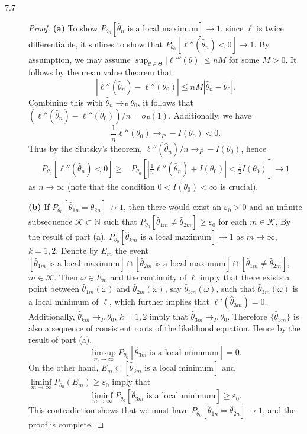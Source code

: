 \documentclass{article}
\newcommand{\eps}{\varepsilon}
\newcommand{\nn}{\mathbb{N}}
\theoremstyle{definition}
\theoremstyle{plain}
\theoremstyle{remark}
\begin{document}
\begin{description}
\item[7.7]
\begin{proof}
\textbf{(a)}
To show $P_{\theta_0}[\hat{\theta}_n \text{ is a local maximum}] \to 1$, since $\ell$ is 
twice differentiable, it suffices to show that $P_{\theta_0}[\ell''(\hat{\theta}_n) < 0] 
\to 1$. By assumption, we may assume $\sup_{\theta \in \Theta}|\ell'''(\theta)| \leq nM$ for 
some $M > 0$. It follows by the mean value theorem that
$$|\ell''(\hat{\theta}_n) - \ell''(\theta_0)| \leq nM|\hat{\theta}_n - \theta_0|.$$
Combining this with $\hat{\theta}_n \to_P \theta_0$, it follows that 
$(\ell''(\hat{\theta}_n) - \ell''(\theta_0))/n = o_P(1)$. Additionally, we have
$$\frac{1}{n}\ell''(\theta_0) \to_P -I(\theta_0) < 0.$$
Thus by the Slutsky's theorem, $\ell''(\hat{\theta}_n)/n \to_P -I(\theta_0)$, hence
\begin{align*}
     P_{\theta_0}[\ell''(\hat{\theta}_n) < 0] 
\geq & P_{\theta_0} \left[\left|\frac{1}{n}\ell''(\hat{\theta}_n) + I(\theta_0) 
\right| < \frac{1}{2}I(\theta_0)\right] 
\to  1
\end{align*}
as $n \to \infty$ (note that the condition $0 < I(\theta_0) < \infty$ is crucial). 

\textbf{(b)}
If $P_{\theta_0}[\hat{\theta}_{1n} = \hat{\theta}_{2n}] \not\to 1$, then there would 
exist an $\eps_0 > 0$ and an infinite subsequence $\mathscr{K} \subset \nn$ such that
$P_{\theta_0}[\hat{\theta}_{1m} \neq \hat{\theta}_{2m}] \geq \eps_0$ for each $m \in 
\mathscr{K}$. By the result of part (a), $P_{\theta_0}[\hat{\theta}_{km} \text{ is
a local maximum}] \to 1$ as $m \to \infty$, $k = 1, 2$. Denote by $E_m$ the event
$[\hat{\theta}_{1m} \text{ is a local maximum}] \cap [\hat{\theta}_{2m} \text{ is 
a local maximum}] \cap [\hat{\theta}_{1m} \neq \hat{\theta}_{2m}]$, $m \in 
\mathscr{K}$. Then $\omega \in E_m$ and the continuity of $\ell$ imply that there 
exists a point between $\hat{\theta}_{1m}(\omega)$ and $\hat{\theta}_{2m}(\omega)$, say
$\hat{\theta}_{3m}(\omega)$, such that $\hat{\theta}_{3m}(\omega)$ is a local minimum
of $\ell$, which further implies that $\ell'(\hat{\theta}_{3m}) = 0$. Additionally, 
$\hat{\theta}_{km} \to_P \theta_0$, $k = 1, 2$ imply that $\hat{\theta}_{3m} \to_P 
\theta_0$. Therefore $\{\hat{\theta}_{3m}\}$ is also a sequence of consistent roots of 
the likelihood equation. Hence by the result of part (a), 
$$\limsup_{m \to \infty} P_{\theta_0}[\hat{\theta}_{3m} \text{ is a local minimum}] = 0.$$
On the other hand, 
$E_m \subset [\hat{\theta}_{3m} \text{ is a local minimum}]$
and
$\liminf\limits_{m \to \infty} P_{\theta_0}(E_m) \geq \eps_0$
imply that $$\liminf\limits_{m \to \infty} P_{\theta_0}[\hat{\theta}_{3m} \text{ is a
local minimum}] \geq \eps_0.$$ This contradiction shows that we must have 
$P_{\theta_0}[\hat{\theta}_{1n} = \hat{\theta}_{2n}] \to 1$, and the proof is complete.
\end{proof}



\end{description}
\end{document}
